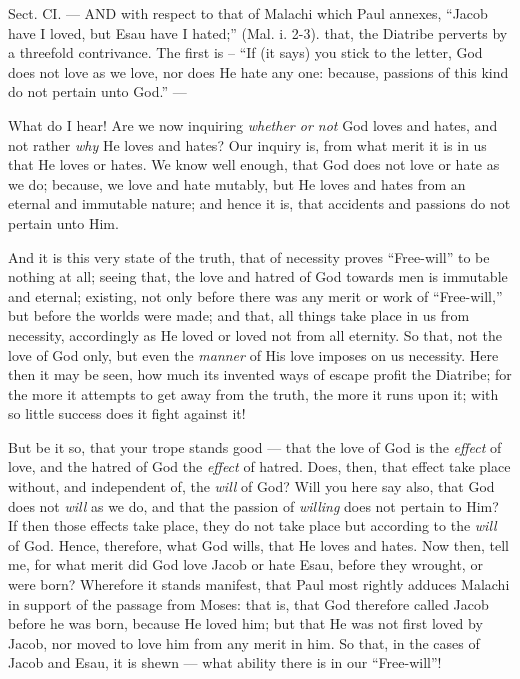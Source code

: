 
Sect. CI. — AND with respect to that of Malachi which Paul annexes, “Jacob have I loved, but Esau have I hated;” (Mal. i. 2-3). that, the Diatribe perverts by a threefold contrivance. The first is – “If (it says) you stick to the letter, God does not love as we love, nor does He hate any one: because, passions of this kind do not pertain unto God.” —

What do I hear! Are we now inquiring \emph{whether or not }God loves and hates, and not rather \emph{why }He loves and hates? Our inquiry is, from what merit it is in us that He loves or hates. We know well enough, that God does not love or hate as we do; because, we love and hate mutably, but He loves and hates from an eternal and immutable nature; and hence it is, that accidents and passions do not pertain unto Him.

And it is this very state of the truth, that of necessity proves “Free-will” to be nothing at all; seeing that, the love and hatred of God towards men is immutable and eternal; existing, not only before there was any merit or work of “Free-will,” but before the worlds were made; and that, all things take place in us from necessity, accordingly as He loved or loved not from all eternity. So that, not the love of God only, but even the \emph{manner }of His love imposes on us necessity. Here then it may be seen, how much its invented ways of escape profit the Diatribe; for the more it attempts to get away from the truth, the more it runs upon it; with so little success does it fight against it!

But be it so, that your trope stands good — that the love of God is the \emph{effect }of love, and the hatred of God the \emph{effect }of hatred. Does, then, that effect take place without, and independent of, the \emph{will }of God? Will you here say also, that God does not \emph{ will }as we do, and that the passion of \emph{willing }does not pertain to Him? If then those effects take place, they do not take place but according to the \emph{will }of God. Hence, therefore, what God wills, that He loves and hates. Now then, tell me, for what merit did God love Jacob or hate Esau, before they wrought, or were born? Wherefore it stands manifest, that Paul most rightly adduces Malachi in support of the passage from Moses: that is, that God therefore called Jacob before he was born, because He loved him; but that He was not first loved by Jacob, nor moved to love him from any merit in him. So that, in the cases of Jacob and Esau, it is shewn — what ability there is in our “Free-will”!

